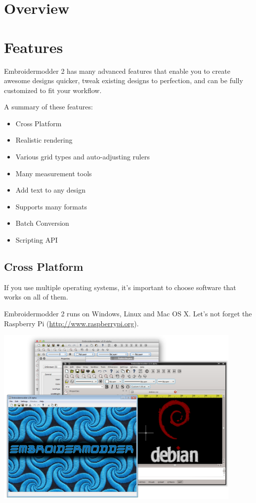 \documentclass[a4paper, 11pt]{report}
\begin{document}
\section{Overview}

\section{Features}

Embroidermodder 2 has many advanced features that enable you to create awesome designs quicker, tweak existing designs to perfection, and can be fully customized to fit your workflow.

A summary of these features:

\begin{itemize}
\item Cross Platform
\item Realistic rendering
\item Various grid types and auto-adjusting rulers
\item Many measurement tools
\item Add text to any design
\item Supports many formats
\item Batch Conversion
\item Scripting API
\end{itemize}

\subsection{Cross Platform}

If you use multiple operating systems, it's important to choose software that works on all of them.

Embroidermodder 2 runs on Windows, Linux and Mac OS X. Let's not forget the Raspberry Pi (\url{http://www.raspberrypi.org}).

\begin{center}
\includegraphics[width=0.9\textwidth]{images/features-platforms-1.png}
\end{center}
\end{document}
